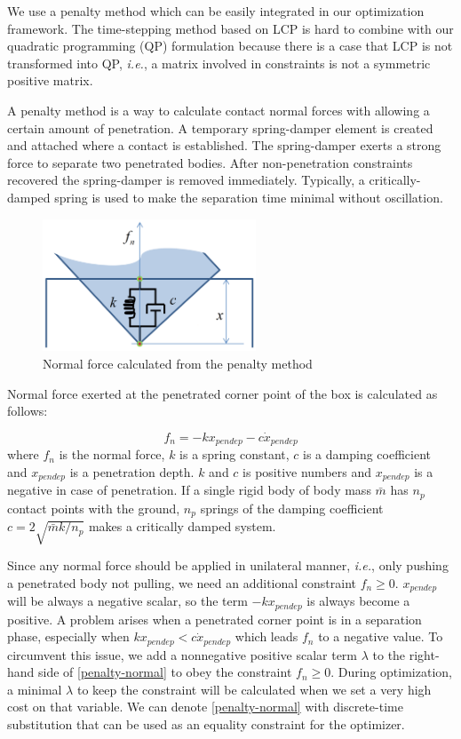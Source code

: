 \documentclass[master,english,final]{kaist-ucs}
\begin{document}
We use a penalty method which can be easily integrated in our optimization framework.
The time-stepping method based on LCP is hard to combine with our quadratic programming (QP) formulation
because there is a case that LCP is not transformed into QP, \emph{i.e.},
a matrix involved in constraints is not a symmetric positive matrix.

A penalty method is a way to calculate contact normal forces with allowing a certain amount of penetration.
A temporary spring-damper element is created and attached where a contact is established.
The spring-damper exerts a strong force to separate two penetrated bodies.
After non-penetration constraints recovered the spring-damper is removed immediately.
Typically, a critically-damped spring is used to make the separation time minimal without oscillation.

\begin{figure}[h!]
  \centering
  \includegraphics[width=2.5in]{penalty}
  \caption{Normal force calculated from the penalty method}
\end{figure}

Normal force exerted at the penetrated corner point of the box is calculated as follows:

\begin{equation}\label{penalty-normal}
f_n = -k x_{pendep} - c \dot{x}_{pendep}
\end{equation}
where $f_n$ is the normal force, $k$ is a spring constant, $c$ is a damping coefficient and $x_{pendep}$ is
a penetration depth. $k$ and $c$ is positive numbers and $x_{pendep}$ is a negative in case of penetration.
If a single rigid body of body mass $\bar{m}$ has $n_p$ contact points with the ground,
$n_p$ springs of the damping coefficient $c=2\sqrt{\bar{m}k/n_p}$ makes a critically damped system.

Since any normal force should be applied in unilateral manner, \emph{i.e.},
only pushing a penetrated body not pulling, we need an additional constraint $f_n \geq 0$.
$x_{pendep}$ will be always a negative scalar, so the term $-kx_{pendep}$ is always become a positive.
A problem arises when a penetrated corner point is in a separation phase,
especially when $kx_{pendep} < c\dot{x}_{pendep}$ which leads $f_n$ to a negative value.
To circumvent this issue, we add a nonnegative positive scalar term $\lambda$ to the right-hand side
of \eqref{penalty-normal} to obey the constraint $f_n \geq 0$. During optimization,
a minimal $\lambda$ to keep the constraint will be calculated
when we set a very high cost on that variable. We can denote \eqref{penalty-normal} with
discrete-time substitution that can be used as an equality constraint for the optimizer.
\end{document}
